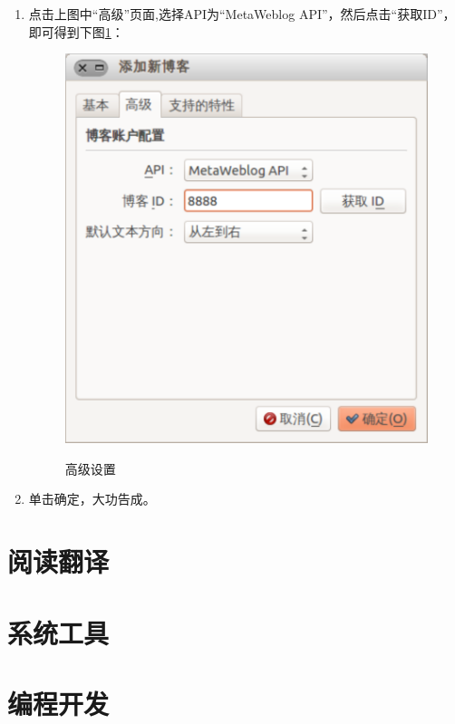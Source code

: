 \begin{enumerate}
\item 点击上图中“高级”页面,选择API为“MetaWeblog API”，然后点击“获取ID”，即可得到下图\ref{fig:blogilo_advantage}：
\begin{figure}[!htbp]
	\centering
	\caption{高级设置}  
		\includegraphics[scale=0.25]{figs/ubuntu_blogilo_advantage.pdf}
    	\label{fig:blogilo_advantage}
\end{figure}

\item 单击确定，大功告成。

\end{enumerate}




\clearpage
\section{阅读翻译}
\section{系统工具}
\section{编程开发}
